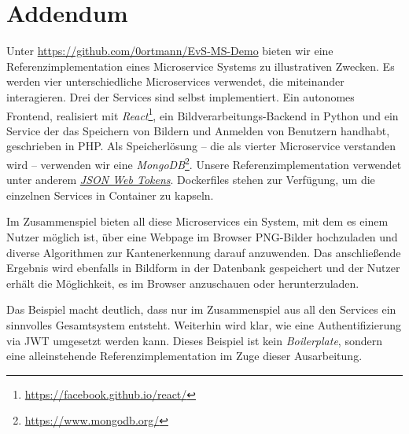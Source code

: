 \section*{Addendum}

Unter \url{https://github.com/0ortmann/EvS-MS-Demo} bieten wir eine Referenzimplementation eines Microservice Systems zu illustrativen Zwecken. Es werden vier unterschiedliche Microservices verwendet, die miteinander interagieren. Drei der Services sind selbst implementiert. Ein autonomes Frontend, realisiert mit \textit{React}\footnote{\url{https://facebook.github.io/react/}}, ein Bildverarbeitungs-Backend in Python und ein Service der das Speichern von Bildern und Anmelden von Benutzern handhabt, geschrieben in PHP. Als Speicherlösung -- die als vierter Microservice verstanden wird -- verwenden wir eine \textit{MongoDB}\footnote{\url{https://www.mongodb.org/}}. Unsere Referenzimplementation verwendet unter anderem \hyperref[subsubsec:jwt]{\em JSON Web Tokens}. Dockerfiles stehen zur Verfügung, um die einzelnen Services in Container zu kapseln.

Im Zusammenspiel bieten all diese Microservices ein System, mit dem es einem Nutzer möglich ist, über eine Webpage im Browser PNG-Bilder hochzuladen und diverse Algorithmen zur Kantenerkennung darauf anzuwenden. Das anschließende Ergebnis wird ebenfalls in Bildform in der Datenbank gespeichert und der Nutzer erhält die Möglichkeit, es im Browser anzuschauen oder herunterzuladen.

Das Beispiel macht deutlich, dass nur im Zusammenspiel aus all den Services ein sinnvolles Gesamtsystem entsteht. Weiterhin wird klar, wie eine Authentifizierung via JWT umgesetzt werden kann. Dieses Beispiel ist kein \textit{Boilerplate}, sondern eine alleinstehende Referenzimplementation im Zuge dieser Ausarbeitung.
